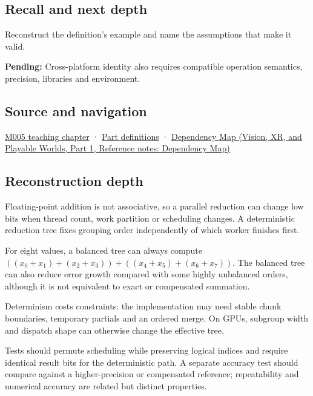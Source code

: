 \subsection{Recall and next depth}\label{appendix-4c8e0238e7ee-recall-and-next-depth}

\hypertarget{appendix-4c8e0238e7ee-recall-and-next-depth}{}

Reconstruct the definition's example and name the assumptions that make it valid.

\textbf{Pending:} Cross-platform identity also requires compatible operation semantics, precision, libraries and environment.

\subsection{Source and navigation}\label{appendix-4c8e0238e7ee-source-and-navigation}

\hypertarget{appendix-4c8e0238e7ee-source-and-navigation}{}

\hyperref[01-foundations-i-ch001-when-arithmetic-meets-uncertainty]{M005 teaching chapter} · \hyperref[appendix-fd090d982a15-m005---parts-77-88]{Part definitions} · \href{../07-Vision-XR-and-Playable-Worlds-P01/main.pdf\#appendix-4ad47bdd269a}{Dependency Map (Vision, XR, and Playable Worlds, Part 1, Reference notes: Dependency Map)}

\subsection{Reconstruction depth}\label{appendix-4c8e0238e7ee-reconstruction-depth}

\hypertarget{appendix-4c8e0238e7ee-reconstruction-depth}{}

Floating-point addition is not associative, so a parallel reduction can change low bits when thread count, work partition or scheduling changes. A deterministic reduction tree fixes grouping order independently of which worker finishes first.

For eight values, a balanced tree can always compute \(((x_0+x_1)+(x_2+x_3)) + ((x_4+x_5)+(x_6+x_7))\). The balanced tree can also reduce error growth compared with some highly unbalanced orders, although it is not equivalent to exact or compensated summation.

Determinism costs constraints: the implementation may need stable chunk boundaries, temporary partials and an ordered merge. On GPUs, subgroup width and dispatch shape can otherwise change the effective tree.

Tests should permute scheduling while preserving logical indices and require identical result bits for the deterministic path. A separate accuracy test should compare against a higher-precision or compensated reference; repeatability and numerical accuracy are related but distinct properties.
